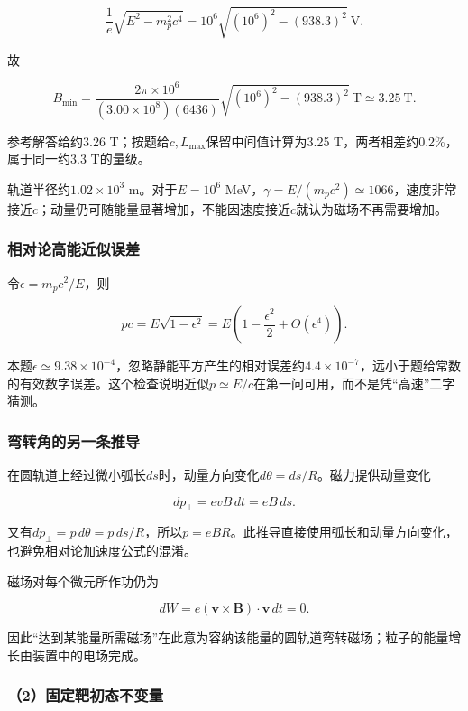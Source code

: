 \documentclass[12pt,a4paper,fontset=fandol]{ctexart}
\begin{document}
\[
\frac1e\sqrt{E^2-m_p^2c^4}
=10^6\sqrt{(10^6)^2-(938.3)^2}\ \mathrm V.
\]

故

\[
B_{\min}
=\frac{2\pi\times10^6}
{(3.00\times10^8)(6436)}
\sqrt{(10^6)^2-(938.3)^2}\ \mathrm T
\simeq\boxed{3.25\ \mathrm T}.
\]

参考解答给约3.26 T；按题给\(c,L_{\max}\)保留中间值计算为3.25
T，两者相差约0.2\%，属于同一约3.3 T的量级。

轨道半径约\(1.02\times10^3\) m。对于\(E=10^6\)
MeV，\(\gamma=E/(m_pc^2)\simeq1066\)，速度非常接近\(c\)；动量仍可随能量显著增加，不能因速度接近\(c\)就认为磁场不再需要增加。

\subsubsection{相对论高能近似误差}\label{ux76f8ux5bf9ux8bbaux9ad8ux80fdux8fd1ux4f3cux8befux5dee}

令\(\epsilon=m_pc^2/E\)，则

\[
pc=E\sqrt{1-\epsilon^2}
=E\left(1-\frac{\epsilon^2}{2}+O(\epsilon^4)\right).
\]

本题\(\epsilon\simeq9.38\times10^{-4}\)，忽略静能平方产生的相对误差约\(4.4\times10^{-7}\)，远小于题给常数的有效数字误差。这个检查说明近似\(p\simeq E/c\)在第一问可用，而不是凭``高速''二字猜测。

\subsubsection{弯转角的另一条推导}\label{ux5f2fux8f6cux89d2ux7684ux53e6ux4e00ux6761ux63a8ux5bfc}

在圆轨道上经过微小弧长\(ds\)时，动量方向变化\(d\theta=ds/R\)。磁力提供动量变化

\[
dp_\perp=evB\,dt=eB\,ds.
\]

又有\(dp_\perp=p\,d\theta=p\,ds/R\)，所以\(p=eBR\)。此推导直接使用弧长和动量方向变化，也避免相对论加速度公式的混淆。

磁场对每个微元所作功仍为

\[
dW=e(\mathbf v\times\mathbf B)\cdot\mathbf v\,dt=0.
\]

因此``达到某能量所需磁场''在此意为容纳该能量的圆轨道弯转磁场；粒子的能量增长由装置中的电场完成。

\subsubsection{（2）固定靶初态不变量}\label{ux56faux5b9aux9776ux521dux6001ux4e0dux53d8ux91cf}
\end{document}
